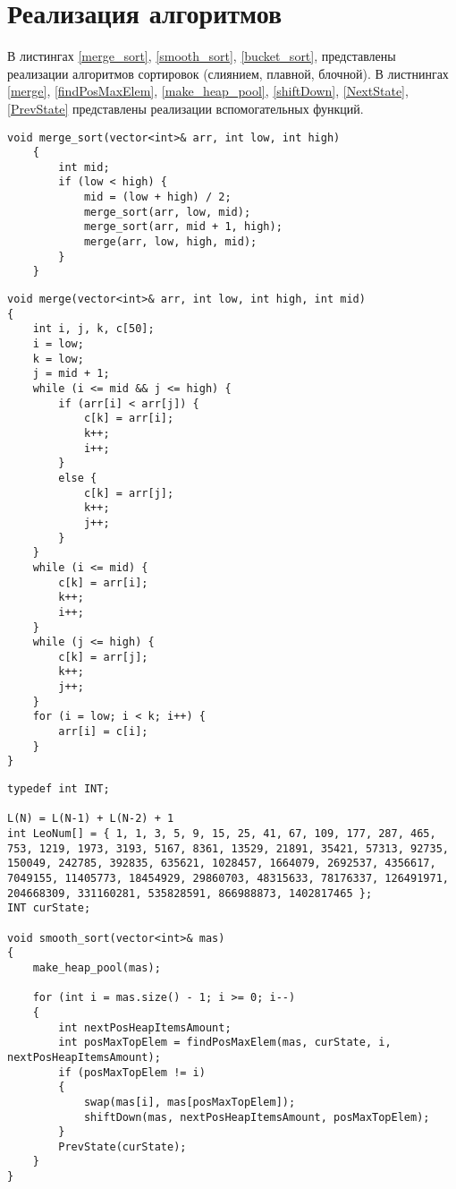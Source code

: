 \section{Реализация алгоритмов}
В листингах \ref{merge_sort}, \ref{smooth_sort}, \ref{bucket_sort}, представлены реализации алгоритмов сортировок (слиянием, плавной, блочной). В листнингах \ref{merge}, \ref{findPosMaxElem}, \ref{make_heap_pool}, \ref{shiftDown}, \ref{NextState}, \ref{PrevState} представлены реализации вспомогательных функций. \clearpage
\begin{center}
\begin{lstlisting}[label=merge_sort, caption={Алгоритм сортировки слиянием}]
	void merge_sort(vector<int>& arr, int low, int high)
	{
		int mid;
		if (low < high) {
			mid = (low + high) / 2;
			merge_sort(arr, low, mid);
			merge_sort(arr, mid + 1, high);
			merge(arr, low, high, mid);
		}
	}
\end{lstlisting}
\end{center}
\newpage
\begin{center}
\begin{lstlisting}[label=merge, caption={Алгоритм функции merge}]
void merge(vector<int>& arr, int low, int high, int mid)
{
	int i, j, k, c[50];
	i = low;
	k = low;
	j = mid + 1;
	while (i <= mid && j <= high) {
		if (arr[i] < arr[j]) {
			c[k] = arr[i];
			k++;
			i++;
		}
		else {
			c[k] = arr[j];
			k++;
			j++;
		}
	}
	while (i <= mid) {
		c[k] = arr[i];
		k++;
		i++;
	}
	while (j <= high) {
		c[k] = arr[j];
		k++;
		j++;
	}
	for (i = low; i < k; i++) {
		arr[i] = c[i];
	}
}
\end{lstlisting}
\end{center}
\newpage
\begin{center}
\begin{lstlisting}[label=smooth_sort,caption = { Алгоритм плавной сортировки}]
typedef int INT;
	
L(N) = L(N-1) + L(N-2) + 1
int LeoNum[] = { 1, 1, 3, 5, 9, 15, 25, 41, 67, 109, 177, 287, 465, 753, 1219, 1973, 3193, 5167, 8361, 13529, 21891, 35421, 57313, 92735, 150049, 242785, 392835, 635621, 1028457, 1664079, 2692537, 4356617, 7049155, 11405773, 18454929, 29860703, 48315633, 78176337, 126491971, 204668309, 331160281, 535828591, 866988873, 1402817465 };
INT curState;

void smooth_sort(vector<int>& mas)
{
	make_heap_pool(mas);
	
	for (int i = mas.size() - 1; i >= 0; i--)
	{
		int nextPosHeapItemsAmount;
		int posMaxTopElem = findPosMaxElem(mas, curState, i, nextPosHeapItemsAmount);
		if (posMaxTopElem != i)
		{
			swap(mas[i], mas[posMaxTopElem]);
			shiftDown(mas, nextPosHeapItemsAmount, posMaxTopElem);
		}
		PrevState(curState);
	}
}
\end{lstlisting}
\end{center}
